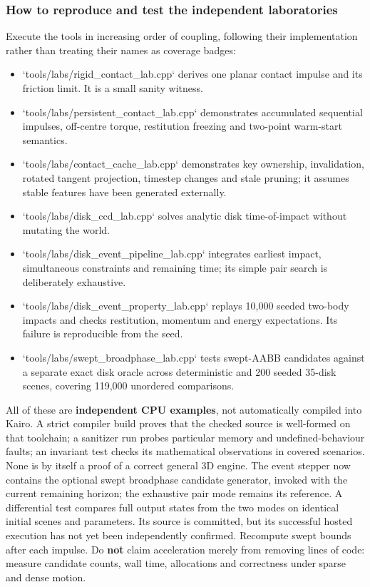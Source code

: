 \subsubsection{How to reproduce and test the independent laboratories}\label{06-engine-ii-ch046-how-to-reproduce-and-test-the-independent-laboratories}

Execute the tools in increasing order of coupling, following their implementation rather than treating their names as coverage badges:

\begin{itemize}
\tightlist
\item
  `tools/labs/rigid\_contact\_lab.cpp` derives one planar contact impulse and its friction limit. It is a small sanity witness.
\item
  `tools/labs/persistent\_contact\_lab.cpp` demonstrates accumulated sequential impulses, off-centre torque, restitution freezing and two-point warm-start semantics.
\item
  `tools/labs/contact\_cache\_lab.cpp` demonstrates key ownership, invalidation, rotated tangent projection, timestep changes and stale pruning; it assumes stable features have been generated externally.
\item
  `tools/labs/disk\_ccd\_lab.cpp` solves analytic disk time-of-impact without mutating the world.
\item
  `tools/labs/disk\_event\_pipeline\_lab.cpp` integrates earliest impact, simultaneous constraints and remaining time; its simple pair search is deliberately exhaustive.
\item
  `tools/labs/disk\_event\_property\_lab.cpp` replays 10,000 seeded two-body impacts and checks restitution, momentum and energy expectations. Its failure is reproducible from the seed.
\item
  `tools/labs/swept\_broadphase\_lab.cpp` tests swept-AABB candidates against a separate exact disk oracle across deterministic and 200 seeded 35-disk scenes, covering 119,000 unordered comparisons.
\end{itemize}

All of these are \textbf{independent CPU examples}, not automatically compiled into Kairo. A strict compiler build proves that the checked source is well-formed on that toolchain; a sanitizer run probes particular memory and undefined-behaviour faults; an invariant test checks its mathematical observations in covered scenarios. None is by itself a proof of a correct general 3D engine. The event stepper now contains the optional swept broadphase candidate generator, invoked with the current remaining horizon; the exhaustive pair mode remains its reference. A differential test compares full output states from the two modes on identical initial scenes and parameters. Its source is committed, but its successful hosted execution has not yet been independently confirmed. Recompute swept bounds after each impulse. Do \textbf{not} claim acceleration merely from removing lines of code: measure candidate counts, wall time, allocations and correctness under sparse and dense motion.

